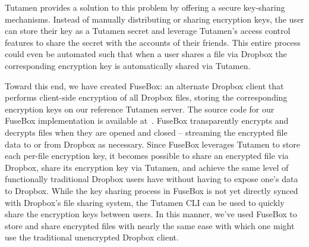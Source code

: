 Tutamen provides a solution to this problem by offering a secure
key-sharing mechanisms. Instead of manually distributing or sharing
encryption keys, the user can store their key as a Tutamen secret and
leverage Tutamen's access control features to share the secret with
the accounts of their friends. This entire process could even be
automated such that when a user shares a file via Dropbox the
corresponding encryption key is automatically shared via Tutamen.

Toward this end, we have created FuseBox: an alternate Dropbox client
that performs client-side encryption of all Dropbox files, storing the
corresponding encryption keys on our reference Tutamen server. The
source code for our FuseBox implementation is available
at~\cite{fusebox}.  FuseBox transparently encrypts and decrypts files
when they are opened and closed -- streaming the encrypted file data
to or from Dropbox as necessary. Since FuseBox leverages Tutamen to
store each per-file encryption key, it becomes possible to share an
encrypted file via Dropbox, share its encryption key via Tutamen, and
achieve the same level of functionally traditional Dropbox users have
without having to expose one's data to Dropbox. While the key sharing
process in FuseBox is not yet directly synced with Dropbox's file
sharing system, the Tutamen CLI can be used to quickly share the
encryption keys between users. In this manner, we've used FuseBox to
store and share encrypted files with nearly the same ease with which
one might use the traditional unencrypted Dropbox client.

